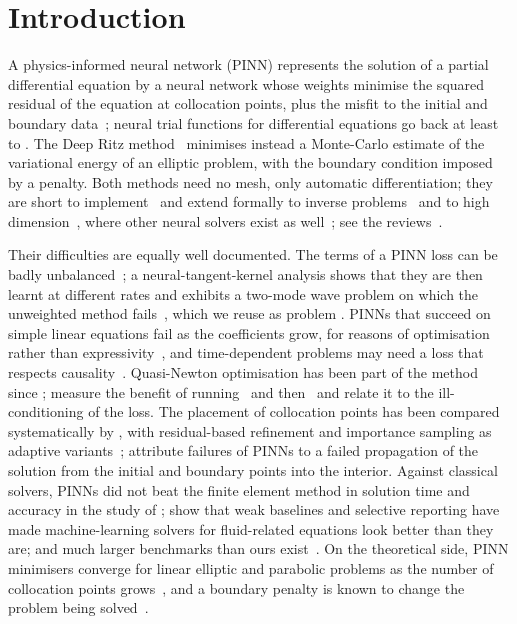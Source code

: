 \section{Introduction}\label{s1_intro:sec}

A physics-informed neural network (PINN) represents the solution of a partial
differential equation by a neural network whose weights minimise the squared residual of
the equation at collocation points, plus the misfit to the initial and boundary
data~\citep{raissi2019}; neural trial functions for differential equations go back at least
to \citet{lagaris1998}. The Deep Ritz method~\citep{eyu2018} minimises instead a
Monte-Carlo estimate of the variational energy of an elliptic problem, with the boundary
condition imposed by a penalty. Both methods need no mesh, only automatic differentiation;
they are short to implement~\citep{lu2021} and extend formally to inverse
problems~\citep{raissi2019} and to high dimension~\citep{sirignano2018}, where other
neural solvers exist as well~\citep{han2018}; see the
reviews~\citep{karniadakis2021,cuomo2022}.

Their difficulties are equally well documented. The terms of a PINN loss can be badly
unbalanced~\citep{wangteng2021}; a neural-tangent-kernel analysis shows that they are then
learnt at different rates and exhibits a two-mode wave problem on which the unweighted
method fails~\citep{wangyu2022}, which we reuse as problem \PWone. PINNs that succeed on simple
linear equations fail as the coefficients grow, for reasons of optimisation rather than
expressivity~\citep{krishnapriyan2021}, and time-dependent problems may need a loss that
respects causality~\citep{wangsankaran2024}. Quasi-Newton optimisation has been part of
the method since \citet{raissi2019}; \citet{rathore2024} measure the benefit of running
\Adam\ and then \LBFGS\ and relate it to the ill-conditioning of the loss. The placement of collocation
points has been compared systematically by \citet{wu2023}, with residual-based refinement
and importance sampling as adaptive variants~\citep{lu2021,nabian2021}; \citet{daw2023}
attribute failures of PINNs to a failed propagation of the solution from the initial and
boundary points into the interior. Against classical
solvers, PINNs did not beat the finite element method in solution time and accuracy in the
study of \citet{grossmann2024}; \citet{mcgreivy2024} show that weak baselines and selective
reporting have made machine-learning solvers for fluid-related equations look better than
they are; and much larger benchmarks than ours exist~\citep{hao2023pinnacle}. On the theoretical side, PINN
minimisers converge for linear elliptic and parabolic problems as the number of collocation
points grows~\citep{shin2020}, and a boundary penalty is known to change the problem being
solved~\citep{babuska1973,muller2022}.


